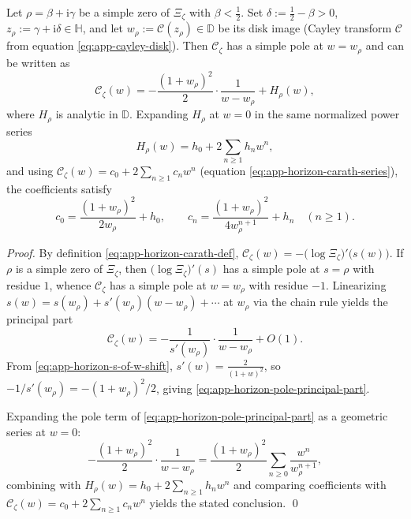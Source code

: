 \begin{proposition}\label{prop:app-horizon-pole-imprint}
Let \(\rho=\beta+\mathrm{i}\gamma\) be a simple zero of \(\Xi_{\zeta}\) with \(\beta<\tfrac12\).
Set \(\delta:=\tfrac12-\beta>0\), \(z_\rho:=\gamma+\mathrm{i}\delta\in\mathbb{H}\), and let \(w_\rho:=\mathcal{C}(z_\rho)\in\mathbb{D}\) be its disk image (Cayley transform \(\mathcal{C}\) from equation \eqref{eq:app-cayley-disk}).
Then \(\mathscr{C}_{\zeta}\) has a simple pole at \(w=w_\rho\) and can be written as
\begin{equation}\label{eq:app-horizon-pole-principal-part}
\boxed{\;
\mathscr{C}_{\zeta}(w)
=-\frac{(1+w_\rho)^2}{2}\cdot\frac{1}{w-w_\rho}+H_\rho(w),\;}
\end{equation}
where \(H_\rho\) is analytic in \(\mathbb{D}\).
Expanding \(H_\rho\) at \(w=0\) in the same normalized power series
\[
H_\rho(w)=h_0+2\sum_{n\ge 1}h_n w^n,
\]
and using \(\mathscr{C}_{\zeta}(w)=c_0+2\sum_{n\ge 1}c_n w^n\) (equation \eqref{eq:app-horizon-carath-series}), the coefficients satisfy
\[
c_0=\frac{(1+w_\rho)^2}{2w_\rho}+h_0,
\qquad
c_n=\frac{(1+w_\rho)^2}{4w_\rho^{n+1}}+h_n\quad(n\ge 1).
\]
\end{proposition}

\begin{proof}
By definition \eqref{eq:app-horizon-carath-def}, \(\mathscr{C}_{\zeta}(w)=-\bigl(\log\Xi_{\zeta}\bigr)'\!\bigl(s(w)\bigr)\).
If \(\rho\) is a simple zero of \(\Xi_{\zeta}\), then \(\bigl(\log\Xi_{\zeta}\bigr)'(s)\) has a simple pole at \(s=\rho\) with residue \(1\), whence \(\mathscr{C}_{\zeta}\) has a simple pole at \(w=w_\rho\) with residue \(-1\).
Linearizing \(s(w)=s(w_\rho)+s'(w_\rho)(w-w_\rho)+\cdots\) at \(w_\rho\) via the chain rule yields the principal part
\[
\mathscr{C}_{\zeta}(w)
=-\frac{1}{s'(w_\rho)}\cdot\frac{1}{w-w_\rho}+O(1).
\]
From \eqref{eq:app-horizon-s-of-w-shift}, \(s'(w)=\frac{2}{(1+w)^2}\), so \(-1/s'(w_\rho)=-(1+w_\rho)^2/2\), giving \eqref{eq:app-horizon-pole-principal-part}.
\par
Expanding the pole term of \eqref{eq:app-horizon-pole-principal-part} as a geometric series at \(w=0\):
\[
-\frac{(1+w_\rho)^2}{2}\cdot\frac{1}{w-w_\rho}
=\frac{(1+w_\rho)^2}{2}\sum_{n\ge 0}\frac{w^n}{w_\rho^{n+1}},
\]
combining with \(H_\rho(w)=h_0+2\sum_{n\ge 1}h_n w^n\) and comparing coefficients with \(\mathscr{C}_{\zeta}(w)=c_0+2\sum_{n\ge 1}c_n w^n\) yields the stated conclusion. \qed
\end{proof}

